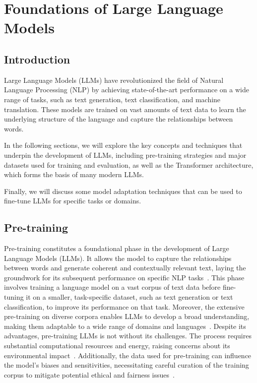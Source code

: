 
\chapter{Foundations of Large Language Models}
\label{ch:foundations-of-large-language-models}

\section{Introduction}
\label{sec:introduction}

Large Language Models (LLMs) have revolutionized the field of Natural Language Processing (NLP) by achieving state-of-the-art performance on a wide range of tasks, such as text generation, text classification, and machine translation.
These models are trained on vast amounts of text data to learn the underlying structure of the language and capture the relationships between words.

In the following sections, we will explore the key concepts and techniques that underpin the development of LLMs, including pre-training strategies and major datasets used for training and evaluation, as well as the Transformer architecture, which forms the basis of many modern LLMs.

Finally, we will discuss some model adaptation techniques that can be used to fine-tune LLMs for specific tasks or domains.

\section{Pre-training}
\label{sec:pre-training}

Pre-training constitutes a foundational phase in the development of Large Language Models (LLMs).
It allows the model to capture the relationships between words and generate coherent and contextually relevant text, laying the groundwork for its subsequent performance on specific NLP tasks~\cite{devlin2019bert, brown2020language}.
This phase involves training a language model on a vast corpus of text data before fine-tuning it on a smaller, task-specific dataset, such as text generation or text classification, to improve its performance on that task.
Moreover, the extensive pre-training on diverse corpora enables LLMs to develop a broad understanding, making them adaptable to a wide range of domains and languages~\cite{liu2019roberta, radford2019language}.
Despite its advantages, pre-training LLMs is not without its challenges.
The process requires substantial computational resources and energy, raising concerns about its environmental impact~\cite{strubell2019energy}.
Additionally, the data used for pre-training can influence the model's biases and sensitivities, necessitating careful curation of the training corpus to mitigate potential ethical and fairness issues~\cite{bender2021dangers}.

